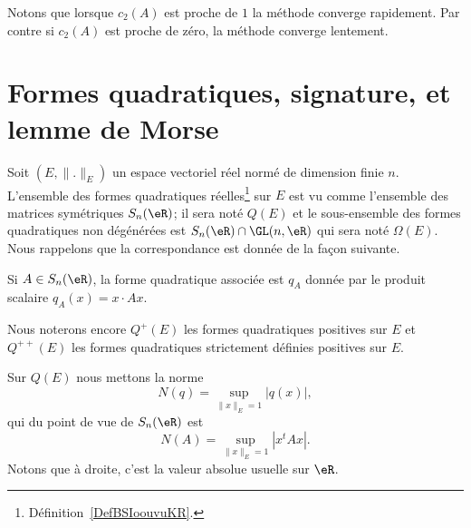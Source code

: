 Notons que lorsque \( c_2(A)\) est proche de \( 1\) la méthode converge rapidement. Par contre si \( c_2(A)\) est proche de zéro, la méthode converge lentement.

\section{Formes quadratiques, signature, et lemme de Morse}

\begin{normaltext}      \label{NORMooHSWKooLtUbRl}
    Soit \( (E,\| . \|_E)\) un espace vectoriel réel normé de dimension finie \( n\). L'ensemble des formes quadratiques réelles\footnote{Définition~\ref{DefBSIoouvuKR}.} sur \( E\) est vu comme l'ensemble des matrices symétriques \( S_n(\eR)\); il sera noté \( Q(E)\) et le sous-ensemble des formes quadratiques non dégénérées est \( S_n(\eR)\cap\GL(n,\eR)\) qui sera noté \( \Omega(E)\). Nous rappelons que la correspondance est donnée de la façon suivante. 
    
    Si \( A\in S_n(\eR)\), la forme quadratique associée est \( q_A\) donnée par le produit scalaire \( q_A(x)=x\cdot Ax\).
\end{normaltext}

\begin{normaltext}      \label{NORMooQZFLooYnILtn}
Nous noterons encore \( Q^+(E)\) les formes quadratiques positives sur \( E\) et \( Q^{++}(E)\) les formes quadratiques strictement définies positives sur \( E\).
\end{normaltext}

Sur \( Q(E)\) nous mettons la norme
\begin{equation}
    N(q)=\sup_{\| x \|_E=1}| q(x) |,
\end{equation}
qui du point de vue de \( S_n(\eR)\) est
\begin{equation}    \label{EqDOgBNAg}
    N(A)=\sup_{\| x \|_E=1}| x^tAx |.
\end{equation}
Notons que à droite, c'est la valeur absolue usuelle sur \( \eR\).

